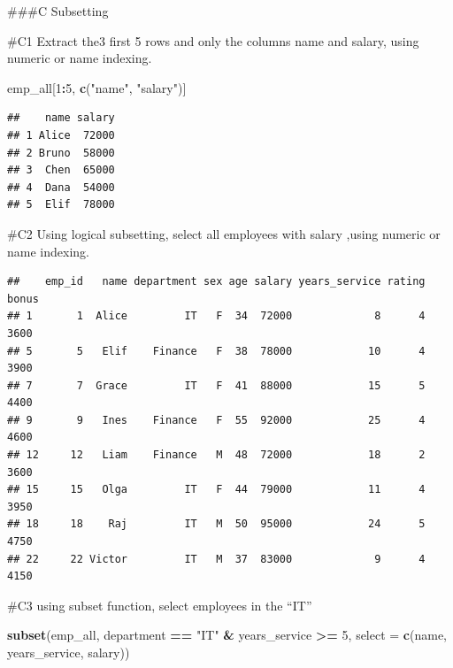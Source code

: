 \documentclass[
]{article}
\newenvironment{Shaded}{\begin{snugshade}}{\end{snugshade}}
\newcommand{\AttributeTok}[1]{\textcolor[rgb]{0.13,0.29,0.53}{#1}}
\newcommand{\DecValTok}[1]{\textcolor[rgb]{0.00,0.00,0.81}{#1}}
\newcommand{\FunctionTok}[1]{\textcolor[rgb]{0.13,0.29,0.53}{\textbf{#1}}}
\newcommand{\NormalTok}[1]{#1}
\newcommand{\SpecialCharTok}[1]{\textcolor[rgb]{0.81,0.36,0.00}{\textbf{#1}}}
\newcommand{\StringTok}[1]{\textcolor[rgb]{0.31,0.60,0.02}{#1}}
\begin{document}
\#\#\#C Subsetting

\#C1 Extract the3 first 5 rows and only the columns name and salary,
using numeric or name indexing.

\begin{Shaded}
\begin{Highlighting}[]
\NormalTok{emp\_all[}\DecValTok{1}\SpecialCharTok{:}\DecValTok{5}\NormalTok{, }\FunctionTok{c}\NormalTok{(}\StringTok{"name"}\NormalTok{, }\StringTok{"salary"}\NormalTok{)]}
\end{Highlighting}
\end{Shaded}

\begin{verbatim}
##    name salary
## 1 Alice  72000
## 2 Bruno  58000
## 3  Chen  65000
## 4  Dana  54000
## 5  Elif  78000
\end{verbatim}

\#C2 Using logical subsetting, select all employees with salary ,using
numeric or name indexing.

\begin{Shaded}
\end{Shaded}

\begin{verbatim}
##    emp_id   name department sex age salary years_service rating bonus
## 1       1  Alice         IT   F  34  72000             8      4  3600
## 5       5   Elif    Finance   F  38  78000            10      4  3900
## 7       7  Grace         IT   F  41  88000            15      5  4400
## 9       9   Ines    Finance   F  55  92000            25      4  4600
## 12     12   Liam    Finance   M  48  72000            18      2  3600
## 15     15   Olga         IT   F  44  79000            11      4  3950
## 18     18    Raj         IT   M  50  95000            24      5  4750
## 22     22 Victor         IT   M  37  83000             9      4  4150
\end{verbatim}

\#C3 using subset function, select employees in the ``IT''

\begin{Shaded}
\begin{Highlighting}[]
\FunctionTok{subset}\NormalTok{(emp\_all,}
\NormalTok{       department }\SpecialCharTok{==} \StringTok{"IT"} \SpecialCharTok{\&}\NormalTok{ years\_service }\SpecialCharTok{\textgreater{}=} \DecValTok{5}\NormalTok{,}
       \AttributeTok{select =} \FunctionTok{c}\NormalTok{(name, years\_service, salary))}
\end{Highlighting}
\end{Shaded}
\end{document}
